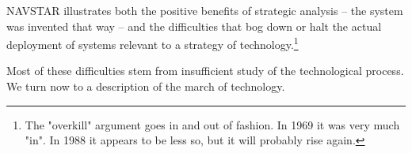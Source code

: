 NAVSTAR illustrates both the positive benefits of strategic analysis -- the system was invented that way -- and the difficulties that bog down or halt the actual deployment of systems relevant to a strategy of technology.\footnote{The "overkill" argument goes in and out of fashion. In 1969 it was very much "in". In 1988 it appears to be less so, but it will probably rise again.}

Most of these difficulties stem from insufficient study of the technological process. We turn now to a description of the march of technology.
